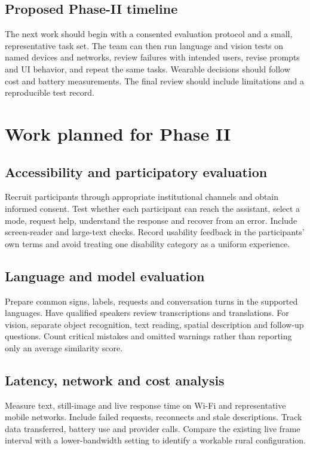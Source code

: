\documentclass[12pt,a4paper,oneside]{report}
\begin{document}
\subsection{Proposed Phase-II timeline}
The next work should begin with a consented evaluation protocol and a small, representative task set. The team can then run language and vision tests on named devices and networks, review failures with intended users, revise prompts and UI behavior, and repeat the same tasks. Wearable decisions should follow cost and battery measurements. The final review should include limitations and a reproducible test record.

\section{Work planned for Phase II}
\subsection{Accessibility and participatory evaluation}
Recruit participants through appropriate institutional channels and obtain informed consent. Test whether each participant can reach the assistant, select a mode, request help, understand the response and recover from an error. Include screen-reader and large-text checks. Record usability feedback in the participants' own terms and avoid treating one disability category as a uniform experience.

\subsection{Language and model evaluation}
Prepare common signs, labels, requests and conversation turns in the supported languages. Have qualified speakers review transcriptions and translations. For vision, separate object recognition, text reading, spatial description and follow-up questions. Count critical mistakes and omitted warnings rather than reporting only an average similarity score.

\subsection{Latency, network and cost analysis}
Measure text, still-image and live response time on Wi-Fi and representative mobile networks. Include failed requests, reconnects and stale descriptions. Track data transferred, battery use and provider calls. Compare the existing live frame interval with a lower-bandwidth setting to identify a workable rural configuration.
\end{document}
